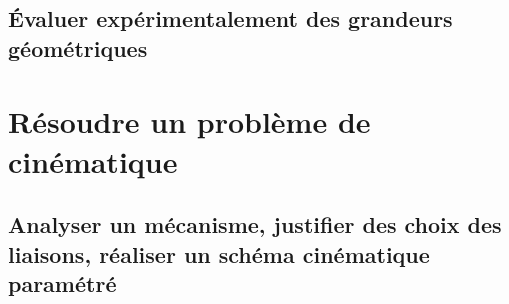 \graphicspath{{\repStyle/png/}{../GEO/GEO-03/13_TransfoMouvement/images/}} 
 
 
\graphicspath{{\repStyle/png/}{../GEO/GEO-03/14_Sympact/images/}} 
 
 
\graphicspath{{\repStyle/png/}{../GEO/GEO-03/15_SympactGalet/images/}} 
 
 
\graphicspath{{\repStyle/png/}{../GEO/GEO-03/16_Poussoir/images/}} 
 
 
\graphicspath{{\repStyle/png/}{../GEO/GEO-03/17_4Barres/images/}} 
 
 
\graphicspath{{\repStyle/png/}{../GEO/GEO-03/18_Maxpid/images/}} 
 
 
\graphicspath{{\repStyle/png/}{../GEO/GEO-03/19_Graham/images/}} 
 
 
\graphicspath{{\repStyle/png/}{../GEO/GEO-03/20_VariateurBilles/images/}} 
 
 
\graphicspath{{\repStyle/png/}{../GEO/GEO-03/54_FauteuilRoulant/images/}} 
 
 
\graphicspath{{\repStyle/png/}{../GEO/GEO-03/64_EPAS/images/}} 
 
 
\section{Évaluer expérimentalement des grandeurs géométriques} 
\setchapterpreamble[u]{\margintoc} 
\chapter{Résoudre un problème de cinématique} 
\section{Analyser un mécanisme, justifier des choix des liaisons, réaliser un schéma cinématique paramétré} 
\graphicspath{{\repStyle/png/}{../CIN/CIN-01-ModeliserSchemasCinematiques/01_T/images/}} 
 
 
\graphicspath{{\repStyle/png/}{../CIN/CIN-01-ModeliserSchemasCinematiques/02_R/images/}} 
 
 
